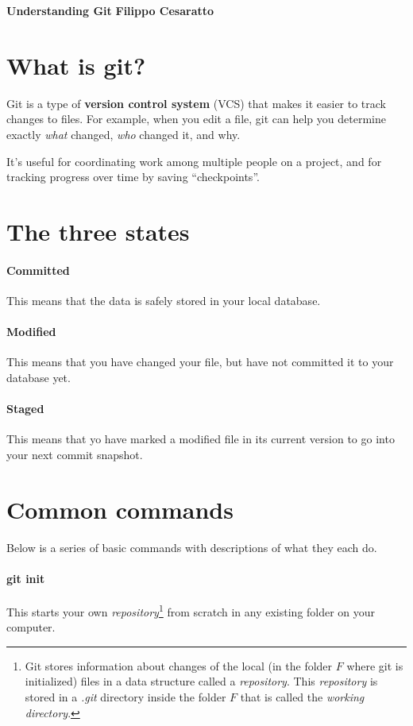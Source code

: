 \documentclass[a4paper, 11pt]{article}
\begin{document}
\noindent
\large\textbf{Understanding Git} \hfill \textbf{Filippo Cesaratto} \\
\normalsize

\section*{What is git?}
Git is a type of \textbf{version control system} (VCS) that makes it easier to track changes to files. For example, when you edit a file, git can help you determine exactly \emph{what} changed, \emph{who} changed it, and why.

It's useful for coordinating work among multiple people on a project, and for tracking progress over time by saving ``checkpoints''. 

\section*{The three states}
\paragraph{Committed} This means that the data is safely stored in your local database.
\paragraph{Modified} This means that you have changed your file, but have not committed it to your database yet.
\paragraph{Staged} This means that yo have marked a modified file in its current version to go into your next commit snapshot.

\section*{Common commands}
Below is a series of basic commands with descriptions of what they each do.

\paragraph{git init}
This starts your own \emph{repository}\footnote{Git stores information about changes of the local (in the folder $F$ where git is initialized) files in a data structure called a \emph{repository}. This \emph{repository} is stored in a \emph{.git} directory inside the folder $F$ that is called the \emph{working directory}.} from scratch in any existing folder on your computer.
\end{document}
